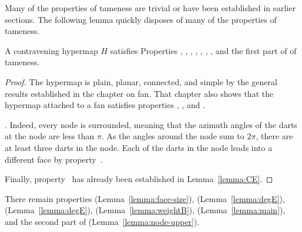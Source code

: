 Many of the properties of tameness are trivial or have been
established in earlier sections.  The following lemma quickly disposes
of many of the properties of tameness.

\begin{lemma}\label{lemma:multi}
  A contravening hypermap $H$ satisfies Properties ,
  , , , , , , and the first
  part of 
of tameness.
\end{lemma}

\begin{proof}
  The hypermap is plain, planar, connected, and simple by the general
  results established in the chapter on fan.  That chapter also shows
  that the hypermap attached to a fan satisfies properties
  , , and .

  .  Indeed, every node is
  surrounded, meaning that the azimuth angles of the darts at the
  node are less than $\pi$.  As the angles around the node sum to
  $2\pi$, there are at least three darts in the node. Each of the
  darts in the node leads into a different face by
  property~.

  Finally, property~ has already been established in
  Lemma~\ref{lemma:CE}.
\end{proof}

There remain properties 
(Lemma~\ref{lemma:face-size}), %
 (Lemma~\ref{lemma:degE}), 
(Lemma~\ref{lemma:degE}), 
(Lemma~\ref{lemma:weightB}), 
(Lemma~\ref{lemma:main}), and the second part of 
(Lemma~\ref{lemma:node-upper}).


